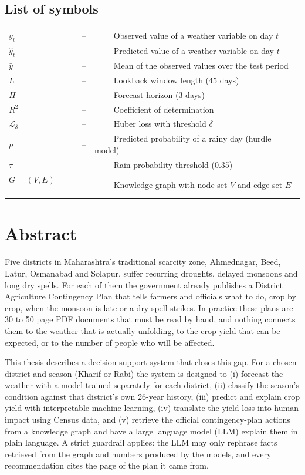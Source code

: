 \documentclass[a4paper, 12pt]{report}
\renewcommand{\_}{\textunderscore\allowbreak}
\theoremstyle{definition}
\begin{document}
\section*{{\huge List of symbols}\hfill} 
\vspace{1.2cm}
\begin{tabular}{lll}
$ y_t $ ~~~~&--&~~~~ Observed value of a weather variable on day $t$\\
$ \hat{y}_t $ ~~~~&--&~~~~ Predicted value of a weather variable on day $t$\\
$ \bar{y} $ ~~~~&--&~~~~ Mean of the observed values over the test period\\
$ L $ ~~~~&--&~~~~ Lookback window length (45 days)\\
$ H $ ~~~~&--&~~~~ Forecast horizon (3 days)\\
$ R^2 $ ~~~~&--&~~~~ Coefficient of determination\\
$ \mathcal{L}_\delta $ ~~~~&--&~~~~ Huber loss with threshold $\delta$\\
$ p $ ~~~~&--&~~~~ Predicted probability of a rainy day (hurdle model)\\
$ \tau $ ~~~~&--&~~~~ Rain-probability threshold (0.35)\\
$ G = (V, E) $ ~~~~&--&~~~~ Knowledge graph with node set $V$ and edge set $E$\\
\end{tabular}
\chapter*{Abstract}
Five districts in Maharashtra's traditional scarcity zone, Ahmednagar, Beed, Latur, Osmanabad and Solapur, suffer recurring droughts, delayed monsoons and long dry spells. For each of them the government already publishes a District Agriculture Contingency Plan that tells farmers and officials what to do, crop by crop, when the monsoon is late or a dry spell strikes. In practice these plans are 30 to 50 page PDF documents that must be read by hand, and nothing connects them to the weather that is actually unfolding, to the crop yield that can be expected, or to the number of people who will be affected.

This thesis describes a decision-support system that closes this gap. For a chosen district and season (Kharif or Rabi) the system is designed to (i) forecast the weather with a model trained separately for each district, (ii) classify the season's condition against that district's own 26-year history, (iii) predict and explain crop yield with interpretable machine learning, (iv) translate the yield loss into human impact using Census data, and (v) retrieve the official contingency-plan actions from a knowledge graph and have a large language model (LLM) explain them in plain language. A strict guardrail applies: the LLM may only rephrase facts retrieved from the graph and numbers produced by the models, and every recommendation cites the page of the plan it came from.
\end{document}
